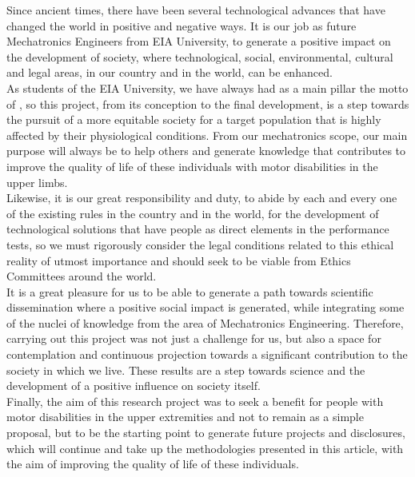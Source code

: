 \documentclass[11pt]{report} %
\begin{document}
Since ancient times, there have been several technological advances that have changed the world in positive and negative ways. It is our job as future Mechatronics Engineers from EIA University, to generate a positive impact on the development of society, where technological, social, environmental, cultural and legal areas, in our country and in the world, can be enhanced.\\

As students of the EIA University, we have always had as a main pillar the motto of , so this project, from its conception to the final development, is a step towards the pursuit of a more equitable society for a target population that is highly affected by their physiological conditions. From our mechatronics scope, our main purpose will always be to help others and generate knowledge that contributes to improve the quality of life of these individuals with motor disabilities in the upper limbs.\\

Likewise, it is our great responsibility and duty, to abide by each and every one of the existing rules in the country and in the world, for the development of technological solutions that have people as direct elements in the performance tests, so we must rigorously consider the legal conditions related to this ethical reality of utmost importance and should seek to be viable from Ethics Committees around the world.\\

It is a great pleasure for us to be able to generate a path towards scientific dissemination where a positive social impact is generated, while integrating some of the nuclei of knowledge from the area of Mechatronics Engineering. Therefore, carrying out this project was not just a challenge for us, but also a space for contemplation and continuous projection towards a significant contribution to the society in which we live. These results are a step towards science and the development of a positive influence on society itself.\\

Finally, the aim of this research project was to seek a benefit for people with motor disabilities in the upper extremities and not to remain as a simple proposal, but to be the starting point to generate future projects and disclosures, which will continue and take up the methodologies presented in this article, with the aim of improving the quality of life of these individuals.\\



\begin{sloppypar}
    
    
\end{sloppypar}
\end{document}
